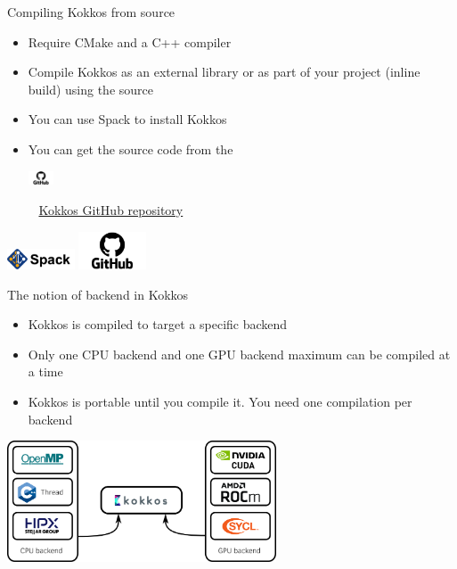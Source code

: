 \documentclass[aspectratio=169]{beamer}
\newcommand{\githublink}[2][2em]{%
    \hspace{-0.25em}%
    \parbox[c][#1][c]{#1}{%
        \includegraphics[width=#1]{GitHub-logo.png}%
    }%
    \hspace{-0.25em}%
    ~%
    #2%
}
\begin{document}

\begin{frame}{Compiling Kokkos from source}
    \begin{itemize}
        \item Require CMake and a C++ compiler
        \item Compile Kokkos as an external library or as part of your project (inline build) using the source
        \item You can use Spack to install Kokkos
        \item You can get the source code from the \githublink{\href{https://github.com/kokkos/kokkos}{Kokkos GitHub repository}}
    \end{itemize}
    \begin{center}
        \includegraphics[width=0.15\textwidth]{spack.png}
        \includegraphics[width=0.15\textwidth]{GitHub-logo.png}
    \end{center}
\end{frame}


\begin{frame}{The notion of backend in Kokkos}
    \begin{itemize}
        \item Kokkos is compiled to target a specific backend
        \item Only one CPU backend and one GPU backend maximum can be compiled at a time
        \item Kokkos is portable until you compile it. You need one compilation per backend
    \end{itemize}
    \begin{center}
        \includegraphics[width=0.6\textwidth]{kokkos_backend.png}
    \end{center}
\end{frame}
\end{document}
